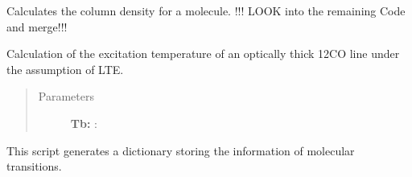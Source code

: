 \documentclass[a4paper,10pt,english]{sphinxmanual}
\begin{document}

\begin{fulllineitems}
\label{lte:astrolyze.lte.lte.calc_N}
Calculates the column density for a molecule.
!!! LOOK into the remaining Code and merge!!!

\end{fulllineitems}


\begin{fulllineitems}
\label{lte:astrolyze.lte.lte.calc_excitation_temperature}
Calculation of the excitation temperature of an optically thick 12CO line
under the assumption of LTE.
\begin{quote}\begin{description}
\item[{Parameters }] \leavevmode
\textbf{Tb:} :

\end{description}\end{quote}

\end{fulllineitems}

\label{lte:module-astrolyze.lte.molecule_parameter}
This script generates a dictionary storing the information of molecular
transitions.
\end{document}
